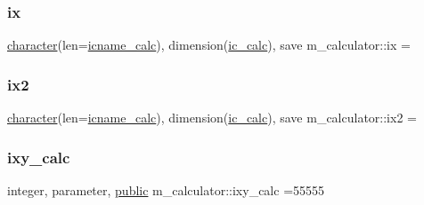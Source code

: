 \mbox{\label{namespacem__calculator_a7570d0ed10f0fc80eeaf3b07ef39c370}} 
\subsubsection{\texorpdfstring{ix}{ix}}
{\footnotesize\ttfamily \hyperlink{option__stopwatch_83_8txt_abd4b21fbbd175834027b5224bfe97e66}{character}(len=\hyperlink{namespacem__calculator_a482f8880712dc8f52ef6833de3243875}{icname\+\_\+calc}), dimension(\hyperlink{namespacem__calculator_a462e5bf8d038196149ba96c22a614284}{ic\+\_\+calc}), save m\+\_\+calculator\+::ix =\textquotesingle{} \textquotesingle{}\hspace{0.3cm}{\ttfamily [private]}}

\mbox{\label{namespacem__calculator_a1d671e939e22b8530ef0cd575bf7dd04}} 
\subsubsection{\texorpdfstring{ix2}{ix2}}
{\footnotesize\ttfamily \hyperlink{option__stopwatch_83_8txt_abd4b21fbbd175834027b5224bfe97e66}{character}(len=\hyperlink{namespacem__calculator_a482f8880712dc8f52ef6833de3243875}{icname\+\_\+calc}), dimension(\hyperlink{namespacem__calculator_a462e5bf8d038196149ba96c22a614284}{ic\+\_\+calc}), save m\+\_\+calculator\+::ix2 =\textquotesingle{} \textquotesingle{}\hspace{0.3cm}{\ttfamily [private]}}

\mbox{\label{namespacem__calculator_addb6e867e526d278a9901ef8e7ff8bb6}} 
\subsubsection{\texorpdfstring{ixy\+\_\+calc}{ixy\_calc}}
{\footnotesize\ttfamily integer, parameter, \hyperlink{M__stopwatch_83_8txt_a2f74811300c361e53b430611a7d1769f}{public} m\+\_\+calculator\+::ixy\+\_\+calc =55555}

\mbox{\label{namespacem__calculator_a7f11fbca3121837187391693c8bf3f01}} 
